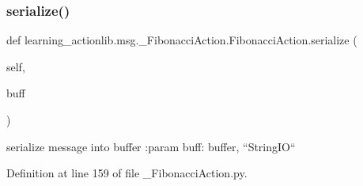 \subsubsection{\texorpdfstring{serialize()}{serialize()}}
{\footnotesize\ttfamily def learning\+\_\+actionlib.\+msg.\+\_\+\+Fibonacci\+Action.\+Fibonacci\+Action.\+serialize (\begin{DoxyParamCaption}\item[{}]{self,  }\item[{}]{buff }\end{DoxyParamCaption})}

\begin{DoxyVerb}serialize message into buffer
:param buff: buffer, ``StringIO``
\end{DoxyVerb}
 

Definition at line 159 of file \+\_\+\+Fibonacci\+Action.\+py.


